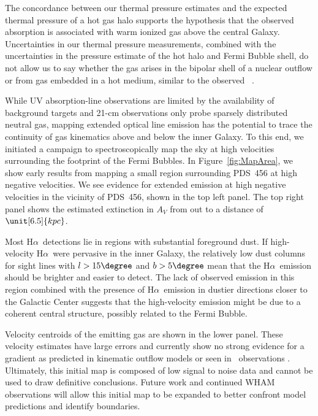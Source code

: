 \documentclass[twocolumn]{aastex63}
\newcommand{\hi}{\ion{H}{1}}
\newcommand{\ha}{H\ensuremath{\alpha}}
\begin{document}
The concordance between our thermal pressure estimates and the expected thermal pressure of a hot gas halo supports the hypothesis that the observed absorption is associated with warm ionized gas above the central Galaxy. Uncertainties in our thermal pressure measurements, combined with the uncertainties in the pressure estimate of the hot halo and Fermi Bubble shell, do not allow us to say whether the gas arises in the bipolar shell of a nuclear outflow or from gas embedded in a hot medium, similar to the observed \hi\ \citep{McClure-Griffiths2013, DiTeodoro2018, Lockman2020}. 

While UV absorption-line observations are limited by the availability of background targets and 21-cm observations only probe sparsely distributed neutral gas, mapping extended optical line emission has the potential to trace the continuity of gas kinematics above and below the inner Galaxy.  
To this end, we initiated a campaign to spectroscopically map the sky at high velocities surrounding the footprint of the Fermi Bubbles. In Figure~\ref{fig:MapArea}, we show early results from mapping a small region surrounding PDS~456 at high negative velocities. We see evidence for extended emission at high negative velocities in the vicinity of PDS~456, shown in the top left panel. The top right panel shows the estimated extinction in $A_V$ from \citet{Green2019} out to a distance of $\unit[6.5]{kpc}$. 

Most \ha\ detections lie in regions with substantial foreground dust. If high-velocity \ha\ were pervasive in the inner Galaxy, the relatively low dust columns for sight lines with $l>15\degree$ and $b > 5\degree$ mean that the \ha\ emission should be brighter and easier to detect.  The lack of observed emission in this region combined with the presence of \ha\ emission in dustier directions closer to the Galactic Center suggests that the high-velocity emission might be due to a coherent central structure, possibly related to the Fermi Bubble. 

Velocity centroids of the emitting gas are shown in the lower panel. These velocity estimates have large errors and currently show no strong evidence for a gradient as predicted in kinematic outflow models \citep[e.g.][]{Bordoloi2017, DiTeodoro2018} or seen in \hi\ observations \citep{Lockman2020}. Ultimately, this initial map is composed of low signal to noise data and cannot be used to draw definitive conclusions. Future work and continued WHAM observations will allow this initial map to be expanded to better confront model predictions and identify boundaries.
\end{document}
